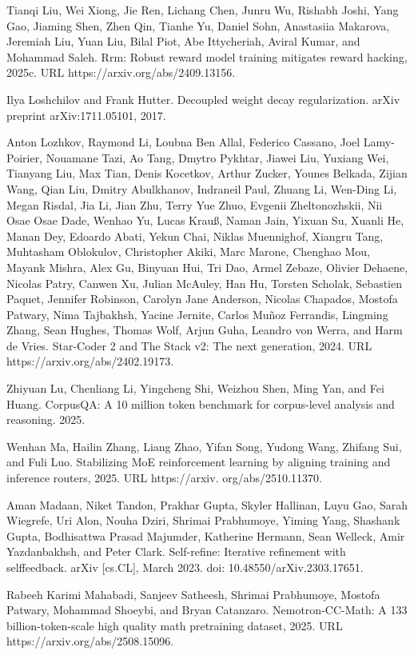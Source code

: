 \documentclass[
  10
]{article}
\begin{document}
Tianqi Liu, Wei Xiong, Jie Ren, Lichang Chen, Junru Wu, Rishabh Joshi,
Yang Gao, Jiaming Shen, Zhen Qin, Tianhe Yu, Daniel Sohn, Anastasiia
Makarova, Jeremiah Liu, Yuan Liu, Bilal Piot, Abe Ittycheriah, Aviral
Kumar, and Mohammad Saleh. Rrm: Robust reward model training mitigates
reward hacking, 2025c. URL https://arxiv.org/abs/2409.13156.

Ilya Loshchilov and Frank Hutter. Decoupled weight decay regularization.
arXiv preprint arXiv:1711.05101, 2017.

Anton Lozhkov, Raymond Li, Loubna Ben Allal, Federico Cassano, Joel
Lamy-Poirier, Nouamane Tazi, Ao Tang, Dmytro Pykhtar, Jiawei Liu,
Yuxiang Wei, Tianyang Liu, Max Tian, Denis Kocetkov, Arthur Zucker,
Younes Belkada, Zijian Wang, Qian Liu, Dmitry Abulkhanov, Indraneil
Paul, Zhuang Li, Wen-Ding Li, Megan Risdal, Jia Li, Jian Zhu, Terry Yue
Zhuo, Evgenii Zheltonozhskii, Nii Osae Osae Dade, Wenhao Yu, Lucas
Krauß, Naman Jain, Yixuan Su, Xuanli He, Manan Dey, Edoardo Abati, Yekun
Chai, Niklas Muennighof, Xiangru Tang, Muhtasham Oblokulov, Christopher
Akiki, Marc Marone, Chenghao Mou, Mayank Mishra, Alex Gu, Binyuan Hui,
Tri Dao, Armel Zebaze, Olivier Dehaene, Nicolas Patry, Canwen Xu, Julian
McAuley, Han Hu, Torsten Scholak, Sebastien Paquet, Jennifer Robinson,
Carolyn Jane Anderson, Nicolas Chapados, Mostofa Patwary, Nima
Tajbakhsh, Yacine Jernite, Carlos Muñoz Ferrandis, Lingming Zhang, Sean
Hughes, Thomas Wolf, Arjun Guha, Leandro von Werra, and Harm de Vries.
Star-Coder 2 and The Stack v2: The next generation, 2024. URL
https://arxiv.org/abs/2402.19173.

Zhiyuan Lu, Chenliang Li, Yingcheng Shi, Weizhou Shen, Ming Yan, and Fei
Huang. CorpusQA: A 10 million token benchmark for corpus-level analysis
and reasoning. 2025.

Wenhan Ma, Hailin Zhang, Liang Zhao, Yifan Song, Yudong Wang, Zhifang
Sui, and Fuli Luo. Stabilizing MoE reinforcement learning by aligning
training and inference routers, 2025. URL https://arxiv.
org/abs/2510.11370.

Aman Madaan, Niket Tandon, Prakhar Gupta, Skyler Hallinan, Luyu Gao,
Sarah Wiegrefe, Uri Alon, Nouha Dziri, Shrimai Prabhumoye, Yiming Yang,
Shashank Gupta, Bodhisattwa Prasad Majumder, Katherine Hermann, Sean
Welleck, Amir Yazdanbakhsh, and Peter Clark. Self-refine: Iterative
refinement with selffeedback. arXiv {[}cs.CL{]}, March 2023. doi:
10.48550/arXiv.2303.17651.

Rabeeh Karimi Mahabadi, Sanjeev Satheesh, Shrimai Prabhumoye, Mostofa
Patwary, Mohammad Shoeybi, and Bryan Catanzaro. Nemotron-CC-Math: A 133
billion-token-scale high quality math pretraining dataset, 2025. URL
https://arxiv.org/abs/2508.15096.
\end{document}

